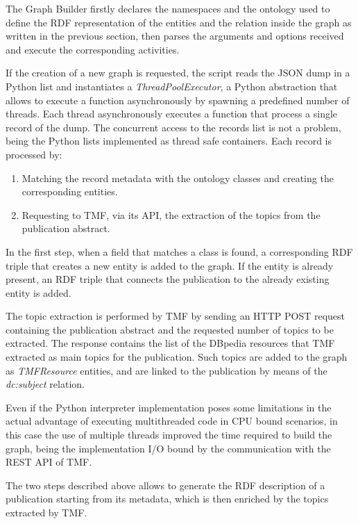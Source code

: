 \documentclass[%
    corpo=13.5pt,
    twoside,
    oldstyle,
    tipotesi=magistrale,
    greek,
    evenboxes
]{toptesi}
\begin{document}
The Graph Builder firstly declares the namespaces and the ontology used to
define the RDF representation of the entities and the relation inside the graph
as written in the previous section, then parses the arguments and options
received and execute the corresponding activities.

If the creation of a new graph is requested, the script reads the JSON dump
in a Python list and instantiates a \emph{ThreadPoolExecutor}, a Python
abstraction that allows to execute a function asynchronously by spawning
a predefined number of threads.
Each thread asynchronously executes a function that process a single record of
the dump.
The concurrent access to the records list is not a problem, being the Python
lists implemented as thread safe containers.
Each record is processed by:

\begin{enumerate}
    \item Matching the record metadata with the ontology classes and
        creating the corresponding entities.
    \item Requesting to TMF, via its API, the extraction of the topics
        from the publication abstract.
\end{enumerate}

In the first step, when a field that matches a class is found, a corresponding
RDF triple that creates a new entity is added to the graph.
If the entity is already present, an RDF triple that connects the
publication to the already existing entity is added.

The topic extraction is performed by TMF by sending an HTTP POST request
containing the publication abstract and the requested number of topics to be extracted.
The response contains the list of the DBpedia resources that TMF
extracted as main topics for the publication. Such topics are added to the
graph as \emph{TMFResource} entities, and are
linked to the publication by means of the \emph{dc:subject} relation.

Even if the Python interpreter implementation poses some limitations in the
actual advantage of executing multithreaded code in CPU bound scenarios, in this
case the use of multiple threads improved the time required to build
the graph, being the implementation I/O bound by the communication with the
REST API of TMF.

The two steps described above allows to generate the RDF description of a
publication starting from its metadata, which is then enriched by the topics
extracted by TMF.
\end{document}
